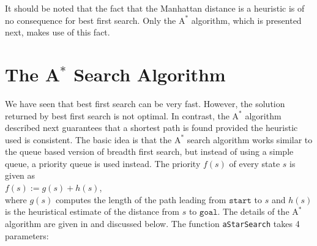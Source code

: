 It should be noted that the fact that the Manhattan distance is a  heuristic is of
no consequence for best first search.  Only the $\mathrm{A}^*$ algorithm, which is presented next, makes use of
this fact.

\section{The A$^*$ Search Algorithm}
We have seen that best first search can be very fast.  However, the solution returned by best first search is
not optimal.  In contrast, the $\mathrm{A}^*$ algorithm described next guarantees that a shortest path is found
provided the heuristic used is consistent.   The basic idea is that the
$\mathrm{A}^*$ search algorithm works similar to the queue based version of breadth first search, but instead
of using a simple queue, a priority queue is used instead.  The priority $f(s)$ of every state $s$ is given as
\\[0.2cm]
\hspace*{1.3cm}
$f(s) := g(s) + h(s)$,
\\[0.2cm]
where $g(s)$ computes the length of the path leading from $\mathtt{start}$ to $s$ and $h(s)$ is the heuristical
estimate of the distance from $s$ to $\mathtt{goal}$.  The details of the $\mathrm{A}^*$ algorithm are given in
 and discussed below. 
The function \texttt{aStarSearch} takes 4 parameters:



